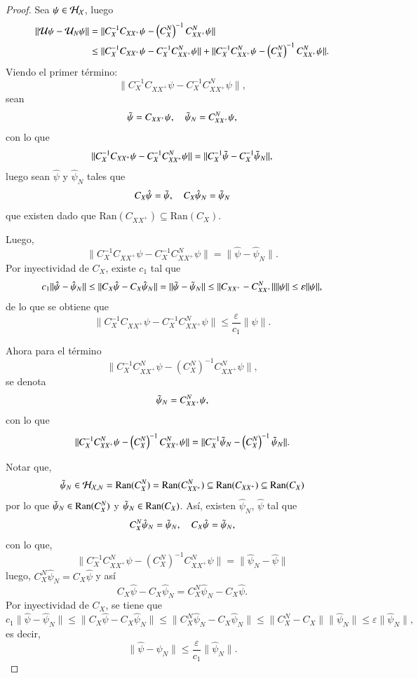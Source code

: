 \begin{proof}
    Sea $\psi \in \mathcal{H}_{\mathcal{X}}$, luego
    \[
    \begin{aligned}
        \| \mathcal{U} \psi - \mathcal{U}_N \psi \| &= \| C_X^{-1} C_{XX^+} \psi - \left (C_X^N \right )^{-1} C_{XX^+}^N \psi \| \\
        & \leq \| C_X^{-1} C_{XX^+} \psi - C_X^{-1} C_{XX^+}^N \psi \| + \| C_X^{-1} C_{XX^+}^N \psi - \left (C_X^N \right )^{-1} C_{XX^+}^N \psi \|.
    \end{aligned}
    \]
    Viendo el primer término:
    \[ \| C_X^{-1} C_{XX^+} \psi - C_X^{-1} C_{XX^+}^N \psi \|, \]
    sean
    \[ \Tilde{\psi} = C_{XX^+} \psi, \quad  \Tilde{\psi}_N = C_{XX^+}^N \psi, \]
    con lo que 
    \[ \| C_X^{-1} C_{XX^+} \psi - C_X^{-1} C_{XX^+}^N \psi \| = \| C_X^{-1} \Tilde{\psi} - C_X^{-1} \Tilde{\psi}_N \|, \]
    luego sean $\hat{\psi}$ y $\hat{\psi}_N$ tales que 
    \[ C_X \hat{\psi} = \Tilde{\psi}, \quad C_X \hat{\psi}_N = \Tilde{\psi}_N \]
    que existen dado que $\text{Ran}(C_{XX^+}) \subseteq \text{Ran}(C_X)$.

    Luego, 
    \[
    \| C_X^{-1} C_{XX^+} \psi - C_X^{-1} C_{XX^+}^N \psi \| = \|\hat{\psi} - \hat{\psi}_N \|.
    \]
    Por inyectividad de $C_X$, existe $c_1$ tal que
    \[
    c_1 \| \hat{\psi} - \hat{\psi}_N  \| \leq \| C_X \hat{\psi} - C_X \hat{\psi}_N \| = \| \Tilde{\psi} - \Tilde{\psi}_N \| \leq \| C_{XX^+} - C_{XX^+}^N \| \| \psi \| \leq \varepsilon \| \psi \|,
    \]
    de lo que se obtiene que 
    \[
    \| C_X^{-1} C_{XX^+} \psi - C_X^{-1} C_{XX^+}^N \psi \| \leq \frac{\varepsilon}{c_1} \| \psi \|.
    \]

    Ahora para el término
    \[
    \| C_X^{-1} C_{XX^+}^N \psi - \left (C_X^N \right )^{-1} C_{XX^+}^N \psi \|,
    \]
    se denota
    \[
    \Tilde{\psi}_N = C_{XX^+}^N \psi,
    \]
    con lo que
    \[
    \| C_X^{-1} C_{XX^+}^N \psi - \left (C_X^N \right )^{-1} C_{XX^+}^N \psi \| = \| C_X^{-1} \Tilde{\psi}_N - \left (C_X^N \right )^{-1} \Tilde{\psi}_N \|.
    \]

    Notar que,
    \[
    \Tilde{\psi}_N \in 
   \mathcal{H}_{\mathcal{X}, N} = \text{Ran}(C_{X}^N) = \text{Ran}(C_{XX^+}^N) \subseteq \text{Ran}(C_{XX^+}) \subseteq \text{Ran}(C_X)
    \]
    por lo que $\Tilde{\psi}_N \in \text{Ran}(C_{X}^N)$ y $\Tilde{\psi}_N \in \text{Ran}(C_{X})$. Así, existen $\hat{\psi}_N$, $\hat{\psi}$ tal que
    \[
    C_X^N \hat{\psi}_N = \Tilde{\psi}_N, \quad C_X \hat{\psi} = \Tilde{\psi}_N,
    \]
    con lo que,
    \[
    \| C_X^{-1} C_{XX^+}^N \psi - \left (C_X^N \right )^{-1} C_{XX^+}^N \psi \| = \| \hat{\psi}_N - \hat{\psi}\|
    \]
    luego, $C_X^N \hat{\psi}_N = C_X \hat{\psi}$ y así
    \[
    C_X \hat{\psi} - C_X \hat{\psi}_N = C_X^N \hat{\psi}_N - C_X \hat{\psi}.
    \]
    Por inyectividad de $C_X$, se tiene que
    \[
    c_1 \| \hat{\psi} - \hat{\psi}_N \| \leq  \| C_X \hat{\psi} - C_X \hat{\psi}_N \| \leq \| C_X^N \hat{\psi}_N - C_X \hat{\psi}_N \| \leq \| C_X^N - C_X\| \| \hat{\psi}_N \| \leq \varepsilon \| \hat{\psi}_N \|,
    \]
    es decir,
    \[
    \| \hat{\psi} - \hat{\psi}_N \| \leq \frac{\varepsilon}{c_1} \| \hat{\psi}_N \|.
    \]
    

\end{proof}
